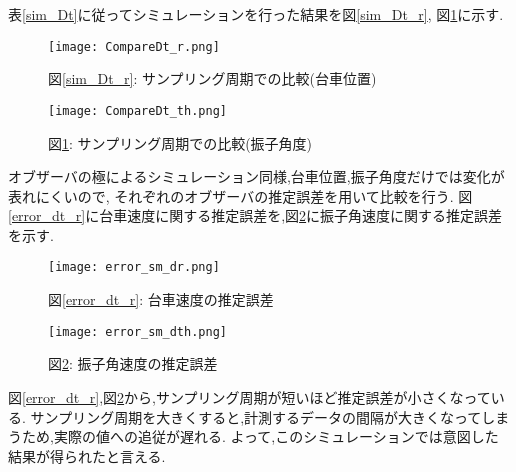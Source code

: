 表\ref{sim_Dt}に従ってシミュレーションを行った結果を図\ref{sim_Dt_r}, 図\ref{sim_Dt_th}に示す.

\begin{figure}[htbp]
    \begin{minipage}{0.5\hsize}
        \begin{center}
            \texttt{[image: CompareDt\_r.png]}
            \caption{図\ref{sim_Dt_r}: サンプリング周期での比較(台車位置)}
            \label{sim_Dt_r}
        \end{center}
    \end{minipage}
    \begin{minipage}{0.5\hsize}
        \begin{center}
            \texttt{[image: CompareDt\_th.png]}
            \caption{図\ref{sim_Dt_th}: サンプリング周期での比較(振子角度)}
            \label{sim_Dt_th}
        \end{center}
    \end{minipage}
\end{figure}

オブザーバの極によるシミュレーション同様,台車位置,振子角度だけでは変化が表れにくいので,
それぞれのオブザーバの推定誤差を用いて比較を行う.
図\ref{error_dt_r}に台車速度に関する推定誤差を,図\ref{error_dt_th}に振子角速度に関する推定誤差を示す.

\begin{figure}[htbp]
    \begin{minipage}{0.5\hsize}
        \begin{center}
            \texttt{[image: error\_sm\_dr.png]}
            \caption{図\ref{error_dt_r}: 台車速度の推定誤差}
            \label{error_dt_r}
        \end{center}
    \end{minipage}
    \begin{minipage}{0.5\hsize}
        \begin{center}
            \texttt{[image: error\_sm\_dth.png]}
            \caption{図\ref{error_dt_th}: 振子角速度の推定誤差}
            \label{error_dt_th}
        \end{center}
    \end{minipage}
\end{figure}

図\ref{error_dt_r},図\ref{error_dt_th}から,サンプリング周期が短いほど推定誤差が小さくなっている.
サンプリング周期を大きくすると,計測するデータの間隔が大きくなってしまうため,実際の値への追従が遅れる.
よって,このシミュレーションでは意図した結果が得られたと言える.


